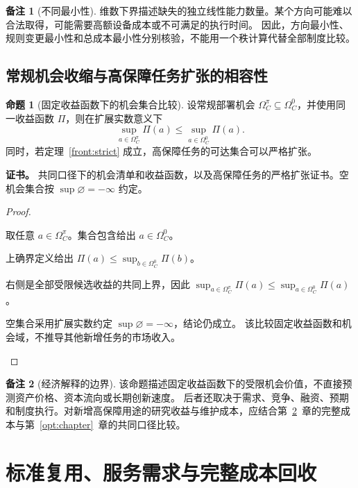 \documentclass[UTF8,12pt,a4paper,openany,fontset=none,zihao=false]{ctexrep}
\theoremstyle{definition}
\newtheorem{proposition}{命题}[chapter]
\newtheorem{remark}{备注}[chapter]
\newenvironment{certificate}{\par\noindent\textbf{证书。}\ignorespaces}{\par}
\newcommand{\1}{\mathbf 1}
\begin{document}
\begin{remark}[不同最小性]
维数下界描述缺失的独立线性能力数量。某个方向可能难以合法取得，可能需要高额设备成本或不可满足的执行时间。
因此，方向最小性、规则变更最小性和总成本最小性分别核验，不能用一个秩计算代替全部制度比较。
\end{remark}

\section{常规机会收缩与高保障任务扩张的相容性}

\begin{proposition}[固定收益函数下的机会集合比较]
\label{front:profit}
设常规部署机会 \(\Omega_C^\pi\subseteq\Omega_C^0\)，并使用同一收益函数 \(\Pi\)，则在扩展实数意义下
\[
\sup_{a\in\Omega_C^\pi}\Pi(a)
\le\sup_{a\in\Omega_C^0}\Pi(a).
\]
同时，若定理~\ref{front:strict} 成立，高保障任务的可达集合可以严格扩张。
\end{proposition}
\begin{certificate}
共同口径下的机会清单和收益函数，以及高保障任务的严格扩张证书。空机会集合按 \(\sup\varnothing=-\infty\) 约定。
\end{certificate}
\begin{proof}
\begin{semanticsteps}
\item 取任意 \(a\in\Omega_C^\pi\)。集合包含给出 \(a\in\Omega_C^0\)。
\item 上确界定义给出 \(\Pi(a)\le\sup_{b\in\Omega_C^0}\Pi(b)\)。
\item 右侧是全部受限候选收益的共同上界，因此
\(\sup_{a\in\Omega_C^\pi}\Pi(a)\le\sup_{a\in\Omega_C^0}\Pi(a)\)。
\item 空集合采用扩展实数约定 \(\sup\varnothing=-\infty\)，结论仍成立。
该比较固定收益函数和机会域，不推导其他新增任务的市场收入。
\end{semanticsteps}
\end{proof}

\begin{remark}[经济解释的边界]
该命题描述固定收益函数下的受限机会价值，不直接预测资产价格、资本流向或长期创新速度。
后者还取决于需求、竞争、融资、预期和制度执行。对新增高保障用途的研究收益与维护成本，应结合第~\ref{integrated:market}~章的完整成本与第~\ref{opt:chapter}~章的共同口径比较。
\end{remark}

\chapter{标准复用、服务需求与完整成本回收}
\label{integrated:market}
\label{market:chapter}
\end{document}
